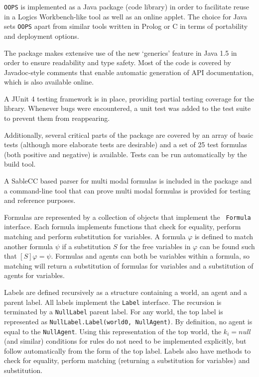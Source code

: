 {\tt OOPS} is implemented as a Java package (code library) in order to
facilitate reuse in a Logics Workbench-like tool as well as an online applet.
The choice for Java sets {\tt OOPS} apart from similar tools written in Prolog
or C in terms of portability and deployment options.

The package makes extensive use of the new `generics' feature in Java 1.5 in
order to ensure readability and type safety. Most of the code is covered by
Javadoc-style comments that enable automatic generation of API documentation,
which is also available online.

A JUnit 4 testing framework is in place, providing partial testing coverage
for the library. Whenever bugs were encountered, a unit test was added to the
test suite to prevent them from reappearing.

Additionally, several critical parts of the package are covered by an array of
basic tests (although more elaborate tests are desirable) and a set of 25
test formulas (both positive and negative) is available. Tests can be run
automatically by the build tool.

A SableCC based parser for multi modal formulas is included in the package and
a command-line tool that can prove multi modal formulas is provided for
testing and reference purposes. 

Formulas are represented by a collection of objects that implement the {\tt
Formula} interface. Each formula implements functions that check for equality,
perform matching and perform substitution for variables. A formula $\varphi$
is defined to match another formula $\psi$ if a substitution $S$ for the free
variables in $\varphi$ can be found such that $\left[ S \right] \varphi =
\psi$. Formulas and agents can both be variables within a formula, so matching
will return a substitution of formulas for variables and a substitution of
agents for variables.

Labels are defined recursively as a structure containing a world, an agent and
a parent label. All labels implement the {\tt Label} interface. The recursion
is terminated by a {\tt NullLabel} parent label. For any world, the top label
is represented as {\tt NullLabel.Label(world0, NullAgent)}. By definition, no
agent is equal to the {\tt NullAgent}. Using this representation of the top
world, the $k_i = null$ (and similar) conditions for rules do not need to be
implemented explicitly, but follow automatically from the form of the top
label. Labels also have methods to check for equality, perform matching
(returning a substitution for variables) and substitution.

